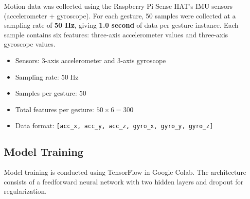 \documentclass[a4paper,12pt]{article}
\begin{document}
Motion data was collected using the Raspberry Pi Sense HAT's IMU sensors (accelerometer + gyroscope). For each gesture, 50 samples were collected at a sampling rate of \textbf{50 Hz}, giving \textbf{1.0 second} of data per gesture instance. Each sample contains six features: three-axis accelerometer values and three-axis gyroscope values.

\begin{itemize}
 \item Sensors: 3-axis accelerometer and 3-axis gyroscope
 \item Sampling rate: 50 Hz
 \item Samples per gesture: 50
 \item Total features per gesture: $50 \times 6 = 300$
 \item Data format: \texttt{[acc\_x, acc\_y, acc\_z, gyro\_x, gyro\_y, gyro\_z]}
\end{itemize}




\subsection{Model Training}

Model training is conducted using TensorFlow in Google Colab. The architecture consists of a feedforward neural network with two hidden layers and dropout for regularization.
\end{document}
